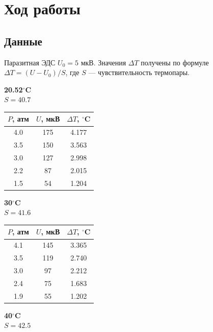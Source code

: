 \documentclass[a4paper, 12pt]{article}
\begin{document}
\section*{Ход работы}
\subsection{Данные}
Паразитная ЭДС \(U_0 = 5\) мкВ. Значения \(\Delta T\) получены по формуле
\(\Delta T = (U - U_0)/S\), где \(S\) — чувствительность термопары.

\small
\begin{table}[h!]
\centering
\setlength{\tabcolsep}{4pt}
\begin{minipage}[t]{0.23\textwidth}
\centering
\textbf{20.52\(^\circ\)C}\\
\(S = 40.7\)
\vspace{2pt}
\begin{tabular}{|c|c|c|}
\hline
\(P\), атм & \(U\), мкВ & \(\Delta T\), \(^\circ\)C \\
\hline
4.0 & 175 & 4.177 \\
3.5 & 150 & 3.563 \\
3.0 & 127 & 2.998 \\
2.2 & 87  & 2.015 \\
1.5 & 54  & 1.204 \\
\hline
\end{tabular}
\end{minipage}
\hfill
\begin{minipage}[t]{0.23\textwidth}
\centering
\textbf{30\(^\circ\)C}\\
\(S = 41.6\)
\vspace{2pt}
\begin{tabular}{|c|c|c|}
\hline
\(P\), атм & \(U\), мкВ & \(\Delta T\), \(^\circ\)C \\
\hline
4.1 & 145 & 3.365 \\
3.5 & 119 & 2.740 \\
3.0 & 97  & 2.212 \\
2.4 & 75  & 1.683 \\
1.9 & 55  & 1.202 \\
\hline
\end{tabular}
\end{minipage}
\hfill
\begin{minipage}[t]{0.23\textwidth}
\centering
\textbf{40\(^\circ\)C}\\
\(S = 42.5\)
\vspace{2pt}
\begin{tabular}{|c|c|c|}

\end{tabular}
\end{minipage}
\end{table}
\end{document}
